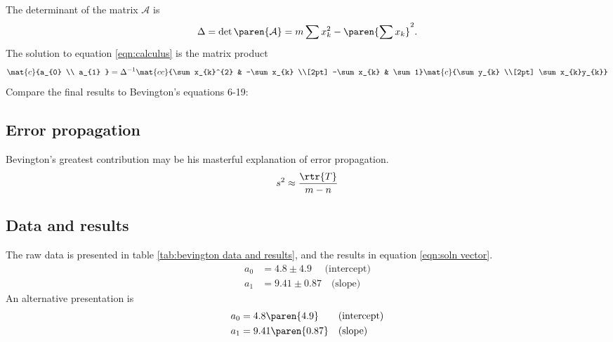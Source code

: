 The determinant of the matrix $\mathcal{A}$ is
  \begin{equation}
    \Delta = \det\paren{\mathcal{A}} = m \sum x_{k}^{2} - \paren{\sum x_{k}}^{2}.
  \end{equation}
The solution to equation \eqref{eqn:calculus} is the matrix product
  \begin{equation}
    \mat{c}{a_{0} \\ a_{1} } = \Delta^{-1}
    \mat{cc}{\sum x_{k}^{2} & -\sum x_{k} \\[2pt] -\sum x_{k} & \sum 1}
    \mat{c}{\sum y_{k} \\[2pt] \sum x_{k}y_{k}}
    \label{eqn:bevington solution product}
  \end{equation}
Compare the final results to Bevington's equations 6-19:

\subsection{Error propagation}
Bevington's greatest contribution may be his masterful explanation of error propagation.
  \begin{equation}
    s^{2} \approx \frac{\rtr{T}} {m-n}
  \end{equation}

\subsection{Data and results}
The raw data is presented in table \eqref{tab:bevington data and results}, and the results in equation \eqref{eqn:soln vector}.
  \begin{equation}
    \begin{split}
      a_{0} &= 4.8 \pm 4.9 \quad \text{\ \ \ (intercept)} \\
      a_{1} &= 9.41 \pm 0.87 \quad \text{(slope)}
    \end{split}
    \label{eqn:soln vector}
  \end{equation}
An alternative presentation is
  \begin{equation}
    \begin{split}
      a_{0} &= 4.8 \paren{4.9} \quad \text{\ \ \ (intercept)} \\
      a_{1} &= 9.41 \paren{0.87} \quad \text{(slope)}
    \end{split}
  \end{equation}

